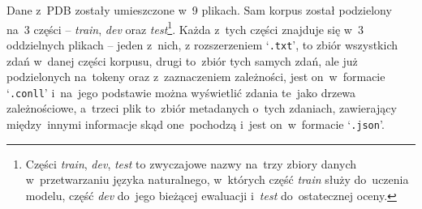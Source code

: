\documentclass[licencjacka]{pracamgr_Kogni}
\begin{document}
    Dane z~PDB zostały umieszczone w~9 plikach.
    Sam korpus został podzielony na~3 części -- \textit{train}, \textit{dev} oraz \textit{test}\footnote{Części \textit{train}, \textit{dev}, \textit{test} to zwyczajowe nazwy na~trzy zbiory danych w~przetwarzaniu języka naturalnego, w~których część \textit{train} służy do~uczenia modelu, część \textit{dev} do~jego bieżącej ewaluacji i~\textit{test} do~ostatecznej oceny.}.
    Każda z~tych części znajduje się w~3 oddzielnych plikach -- jeden z~nich, z rozszerzeniem `\texttt{.txt}', to zbiór wszystkich zdań w~danej części korpusu, drugi to~zbiór tych samych zdań, ale już podzielonych na~tokeny oraz z~zaznaczeniem zależności, jest on~w~formacie `\texttt{.conll}' i~na~jego podstawie można wyświetlić zdania te~jako drzewa zależnościowe, a~trzeci plik to~zbiór metadanych o~tych zdaniach, zawierający między~innymi informacje skąd one~pochodzą i~jest on~w~formacie `\texttt{.json}'.
\end{document}
